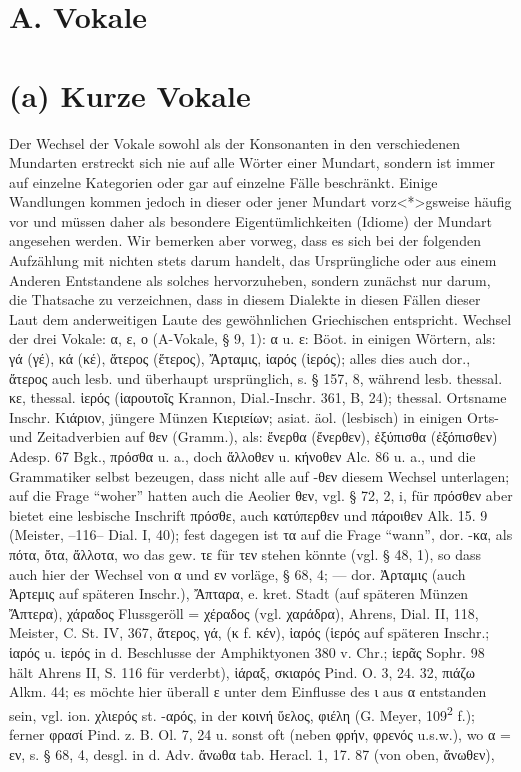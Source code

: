 
\renewcommand{\chaptitlefont}{\centering\large\bfseries\scshape}
\renewcommand{\chaptitlefont}{\centering\LARGE\bfseries\scshape}

\section*{A. Vokale}
\section{(a) Kurze Vokale}

Der Wechsel der Vokale sowohl als der Konsonanten in den verschiedenen Mundarten erstreckt sich nie auf alle Wörter einer Mundart, sondern ist immer auf einzelne Kategorien oder gar auf einzelne Fälle beschränkt. Einige Wandlungen kommen jedoch in dieser oder jener Mundart vorz<*>gsweise häufig vor und müssen daher als besondere Eigentümlichkeiten (Idiome) der Mundart angesehen werden. Wir bemerken aber vorweg, dass es sich bei der folgenden Aufzählung mit nichten stets darum handelt, das Ursprüngliche oder aus einem Anderen Entstandene als solches hervorzuheben, sondern zunächst nur darum, die Thatsache zu verzeichnen, dass in diesem Dialekte in diesen Fällen dieser Laut dem anderweitigen Laute des gewöhnlichen Griechischen entspricht. Wechsel der drei Vokale: α, ε, ο (A-Vokale, § 9, 1): α u. ε: Böot. in einigen Wörtern, als: γά (γέ), κά (κέ), ἅτερος (ἕτερος), Ἄρταμις, ἱαρός (ἱερός); alles dies auch dor., ἄτερος auch lesb. und überhaupt ursprünglich, s. § 157, 8, während lesb. thessal. κε, thessal. ἱερός (ἱαρουτοῖς Krannon, Dial.-Inschr. 361, Β, 24); thessal. Ortsname Inschr. Κιάριον, jüngere Münzen Κιεριείων; asiat. äol. (lesbisch) in einigen Orts- und Zeitadverbien auf θεν (Gramm.), als: ἔνερθα (ἔνερθεν), ἐξύπισθα (ἐξόπισθεν) Adesp. 67 Bgk., πρόσθα u. a., doch ἄλλοθεν u. κήνοθεν Alc. 86 u. a., und die Grammatiker selbst bezeugen, dass nicht alle auf -θεν diesem Wechsel unterlagen; auf die Frage “woher” hatten auch die Aeolier θεν, vgl. § 72, 2, i, für πρόσθεν aber bietet eine lesbische Inschrift πρόσθε, auch κατύπερθεν und πάροιθεν Alk. 15. 9 (Meister, --116-- Dial. I, 40); fest dagegen ist τα auf die Frage “wann”, dor. -κα, als πότα, ὄτα, ἄλλοτα, wo das gew. τε für τεν stehen könnte (vgl. § 48, 1), so dass auch hier der Wechsel von α und εν vorläge, § 68, 4; — dor. Ἀρταμις (auch Ἀρτεμις auf späteren Inschr.), Ἄπταρα, e. kret. Stadt (auf späteren Münzen Ἄπτερα), χάραδος Flussgeröll = χέραδος (vgl. χαράδρα), Ahrens, Dial. II, 118, Meister, C. St. IV, 367, ἅτερος, γά, (κ f. κέν), ἱαρός (ἱερός auf späteren Inschr.; ἱαρός u. ἱερός in d. Beschlusse der Amphiktyonen 380 v. Chr.; ἱερᾶς Sophr. 98 hält Ahrens II, S. 116 für verderbt), ἱάραξ, σκιαρός Pind. O. 3, 24. 32, πιάζω Alkm. 44; es möchte hier überall ε unter dem Einflusse des ι aus α entstanden sein, vgl. ion. χλιερός st. -αρός, in der κοινή ὕελος, φιέλη (G. Meyer, 109\textsuperscript{2} f.); ferner φρασί Pind. z. B. Ol. 7, 24 u. sonst oft (neben φρήν, φρενός u.s.w.), wo α = εν, s. § 68, 4, desgl. in d. Adv. ἄνωθα tab. Heracl. 1, 17. 87 (von oben, ἄνωθεν), 
